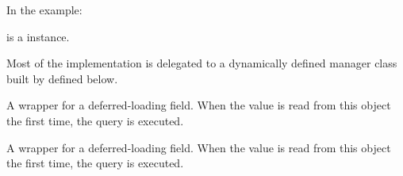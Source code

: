 \documentclass[letterpaper,10pt,english]{sphinxmanual}
\begin{document}
\begin{fulllineitems}
\begin{fulllineitems}
In the example:

%
\begin{sphinxVerbatim}[commandchars=\\\{\}]
 
       
\end{sphinxVerbatim}

 is a  instance.

Most of the implementation is delegated to a dynamically defined manager
class built by  defined below.

\end{fulllineitems}


\begin{fulllineitems}
\label{\detokenize{QuChemPedIA.models:QuChemPedIA.models.UserModel.Utilisateur.number_of_upload_this_day}}
A wrapper for a deferred-loading field. When the value is read from this
object the first time, the query is executed.

\end{fulllineitems}


\begin{fulllineitems}
\label{\detokenize{QuChemPedIA.models:QuChemPedIA.models.UserModel.Utilisateur.objects}}
\end{fulllineitems}


\begin{fulllineitems}
\label{\detokenize{QuChemPedIA.models:QuChemPedIA.models.UserModel.Utilisateur.orcid}}
A wrapper for a deferred-loading field. When the value is read from this
object the first time, the query is executed.


\end{fulllineitems}
\end{fulllineitems}
\end{document}
